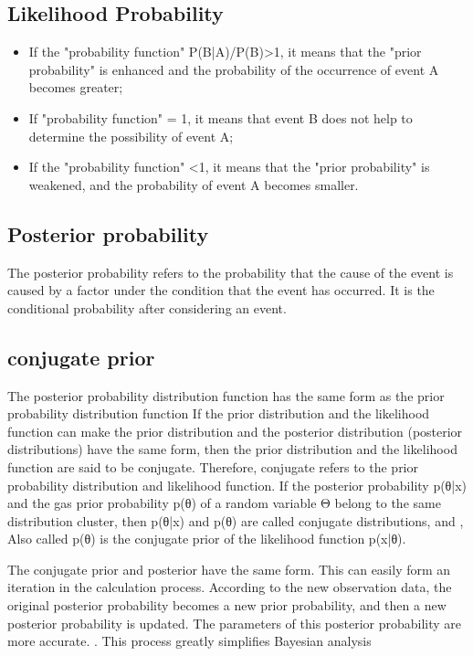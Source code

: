 \subsection{Likelihood Probability}
\begin{itemize}
  \item If the "probability function" P(B|A)/P(B)>1, it means that the "prior probability" is enhanced and the probability of the occurrence of event A becomes greater;
  \item If "probability function" = 1, it means that event B does not help to determine the possibility of event A;
  \item If the "probability function" <1, it means that the "prior probability" is weakened, and the probability of event A becomes smaller.
\end{itemize}
\subsection{Posterior probability}
The posterior probability refers to the probability that the cause of the event is caused by a factor under the condition that the event has occurred. It is the conditional probability after considering an event.

\subsection{conjugate prior}
The posterior probability distribution function has the same form as the prior probability distribution function
If the prior distribution and the likelihood function can make the prior distribution and the posterior distribution (posterior distributions) have the same form, then the prior distribution and the likelihood function are said to be conjugate. Therefore, conjugate refers to the prior probability distribution and likelihood function. If the posterior probability p(θ|x) and the gas prior probability p(θ) of a random variable Θ belong to the same distribution cluster, then p(θ|x) and p(θ) are called conjugate distributions, and , Also called p(θ) is the conjugate prior of the likelihood function p(x|θ).


The conjugate prior and posterior have the same form. This can easily form an iteration in the calculation process. According to the new observation data, the original posterior probability becomes a new prior probability, and then a new posterior probability is updated. The parameters of this posterior probability are more accurate. . This process greatly simplifies Bayesian analysis
